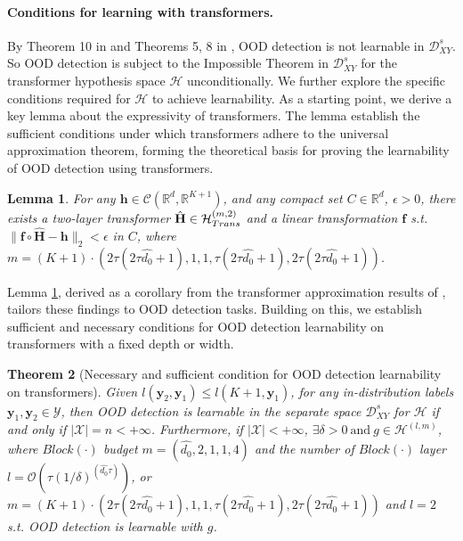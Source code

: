 \documentclass{article}
\theoremstyle{plain}
\newtheorem{theorem}{Theorem}[section]
\newtheorem{lemma}[theorem]{Lemma}
\theoremstyle{definition}
\theoremstyle{remark}
\begin{document}
\paragraph{Conditions for learning with transformers.}
%
By Theorem 10 in \citet{fang2022out} and Theorems 5, 8 in \citet{bartlett2003vapnik}, OOD detection is not learnable in $\mathcal{D}_{XY}^s$. So OOD detection is subject to the Impossible Theorem in $\mathcal{D}_{XY}^s$ for the transformer hypothesis space $\mathcal{H}$ unconditionally.
We further explore the specific conditions required for  $\mathcal{H}$ to achieve learnability. 
%
As a starting point, we derive a key lemma about the expressivity of transformers. The lemma establish the sufficient conditions under which transformers adhere to the universal approximation theorem, forming the theoretical basis for proving the learnability of OOD detection using transformers.

\begin{lemma}
    For any $\mathbf{h} \in \mathcal{C}(\mathbb{R}^d, \mathbb{R}^{K+1})$, and any compact set $C \in \mathbb{R}^d$, $\epsilon >0$, there exists a two-layer transformer $\hat{\mathbf{H}} \in \mathcal{H}_{\rm Trans}^{(m,2)}$ and a linear transformation $\mathbf{f}$ \textit{s}.\textit{t}. $\|\mathbf{f}\circ \hat{\mathbf{H}}-\mathbf{h}\|_2<\epsilon $ in $C$, where $m=(K+1)\cdot \left(2\tau(2\tau \hat{d_0}+1),1,1,\tau(2\tau \hat{d_0}+1),2\tau(2\tau \hat{d_0}+1)\right)$.
    \label{Lemma 4.2}
\end{lemma}


Lemma \ref{Lemma 4.2}, derived as a corollary from the transformer approximation results of \citet{jiang2023approximation}, tailors these findings to OOD detection tasks. Building on this, we establish sufficient and necessary conditions for OOD detection learnability on transformers with a fixed depth or width. 

\begin{theorem}
[Necessary and sufficient condition for OOD detection learnability on transformers]

    Given $l(\mathbf{y}_2, \mathbf{y}_1) \leq l(K + 1, \mathbf{y}_1)$, for any in-distribution labels $\mathbf{y}_1, \mathbf{y}_2 \in \mathcal{Y}$, then OOD detection is learnable in the separate space $\mathcal{D}_{XY}^s$ for $\mathcal{H}$ if and only if $|\mathcal{X}|=n<+\infty$. 
    Furthermore, if $|\mathcal{X}|<+\infty$, $\exists \delta>0~\text{and}~g\in \mathcal{H}^{(l,m)}$, where $Block(\cdot)$ budget $m = (\hat{d_0}, 2, 1, 1, 4)$ and the number of $Block(\cdot)$ layer $l=\mathcal{O}\left(\tau(1/\delta)^{(\hat{d_0}\tau)}\right)$, 
    or $m = (K+1)\cdot\left(2\tau(2\tau \hat{d_0}+1),1,1,\tau(2\tau \hat{d_0}+1),2\tau(2\tau \hat{d_0}+1)\right)$ and $l=2$
    \textit{s}.\textit{t}. OOD detection is learnable with $g$.
    \label{Theorem2}
\end{theorem}
\end{document}
